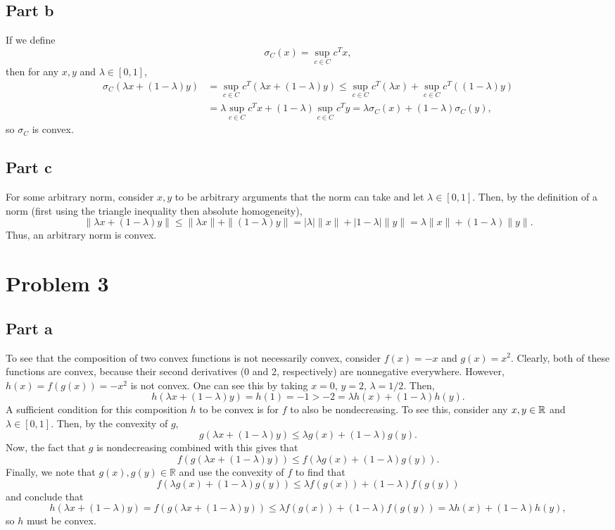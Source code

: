 \documentclass{article}
\begin{document}
\subsection{Part b}
If we define 
\[
\sigma_C(x) = \sup_{c \in C} c^Tx,
\]
then for any $x,y$ and $\lambda\in[0,1]$, 
\begin{align*}
  \sigma_C(\lambda x+(1-\lambda)y)&= \sup_{c \in C} c^T(\lambda x+(1-\lambda)y)\leq\sup_{c \in C} c^T(\lambda x)+\sup_{c \in C} c^T((1-\lambda) y)\\&=
  \lambda\sup_{c \in C} c^Tx+(1-\lambda)\sup_{c \in C} c^Ty=\lambda\sigma_C(x)+(1-\lambda)\sigma_C(y),
\end{align*}
so $\sigma_C$ is convex.

\subsection{Part c}
For some arbitrary norm, consider $x,y$ to be arbitrary arguments that the norm can take and let $\lambda\in[0,1]$. Then, by the definition of a norm (first using the triangle inequality then absolute homogeneity),
\[
\|\lambda x+(1-\lambda)y\|\leq\|\lambda x\|+\|(1-\lambda)y\|=|\lambda|\|x\|+|1-\lambda|\|y\|=\lambda\|x\|+(1-\lambda)\|y\|.
\]
Thus, an arbitrary norm is convex. 

\section{Problem 3} 
\subsection{Part a}
To see that the composition of two convex functions is not necessarily convex, consider $f(x)=-x$ and $g(x)=x^2$. Clearly, both of these functions are convex, because their second derivatives (0 and 2, respectively) are nonnegative everywhere. However, $h(x)=f(g(x))=-x^2$ is not convex. One can see this by taking $x=0$, $y=2$, $\lambda=1/2$. Then,
\[
h(\lambda x+(1-\lambda)y)=h(1)=-1>-2=\lambda h(x)+(1-\lambda)h(y).
\]
A sufficient condition for this composition $h$ to be convex is for $f$ to also be nondecreasing. To see this, consider any $x,y\in\mathbb{R}$ and $\lambda\in[0,1]$. Then, by the convexity of $g$, 
\[
g(\lambda x+(1-\lambda)y)\leq\lambda g(x)+(1-\lambda)g(y).
\]
Now, the fact that $g$ is nondecreasing combined with this gives that 
\[
f(g(\lambda x+(1-\lambda)y))\leq f(\lambda g(x)+(1-\lambda)g(y)).
\]
Finally, we note that $g(x),g(y)\in\mathbb{R}$ and use the convexity of $f$ to find that 
\[
f(\lambda g(x)+(1-\lambda)g(y))\leq \lambda f(g(x))+(1-\lambda)f(g(y))
\]
and conclude that 
\[
h(\lambda x+(1-\lambda)y)=f(g(\lambda x+(1-\lambda)y))\leq \lambda f(g(x))+(1-\lambda)f(g(y))=\lambda h(x)+(1-\lambda)h(y),
\]
so $h$ must be convex.
\end{document}
